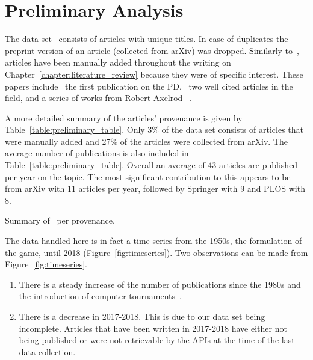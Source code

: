 \section{Preliminary Analysis}\label{section:preliminary}

The data set~\cite{pd_data_2018} consists of \totalarticles articles with unique
titles. In case of duplicates the preprint version of an article (collected from
arXiv) was dropped. Similarly to~\cite{Liu2015}, \manual articles have been manually
added throughout the writing on Chapter~\ref{chapter:literature_review} because
they were of specific interest. These papers include~\cite{Flood1958} the first
publication on the PD,~\cite{Ohtsuki2006, Stewart2012} two well cited
articles in the field, and a series of works from Robert Axelrod
~\cite{Axelrod1980a, Axelrod1980b, Axelrod1987, Axelrod1981, Riolo2001}.

A more detailed summary of the articles' provenance
is given by Table~\ref{table:preliminary_table}. Only 3\% of the data set consists of
articles that were manually added and 27\% of the articles were collected from
arXiv. The average number of publications is also included in
Table~\ref{table:preliminary_table}. Overall an average of 43 articles are published
per year on the topic. The most significant contribution to this appears to be
from arXiv with 11 articles per year, followed by Springer with 9 and PLOS with
8.

\begin{table}[!hbtp]
    \begin{center}
    \resizebox{.9\textwidth}{!}{
    }
    \end{center}
    \caption{Summary of~\cite{pd_data_2018} per provenance.}
    \label{table:preliminary_table}
\end{table}

The data handled  here is in fact a time series from the 1950s, the formulation
of the game, until 2018 (Figure~\ref{fig:timeseries}). Two observations can be
made from Figure~\ref{fig:timeseries}.

\begin{enumerate}
    \item There is a steady increase of the number of publications since the
    1980s and the introduction of computer tournaments~\cite{Axelrod1981}.
    \item There is a decrease in 2017-2018. This is due to our data set being
    incomplete. Articles that have been written in 2017-2018 have either not
    being published or were not retrievable by the APIs at the time of the last
    data collection.
\end{enumerate}

